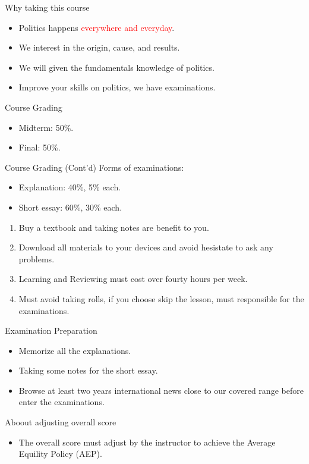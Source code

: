 \documentclass{beamer}
\begin{document}
\begin{frame}{Why taking this course}
\begin{itemize}
\item Politics happens \textcolor{red}{everywhere and everyday}.
\item We interest in the origin, cause, and results.
\item We will given the fundamentals knowledge of politics.
\item Improve your skills on politics, we have examinations.
\end{itemize}
\end{frame}
\begin{frame}{Course Grading}
\begin{itemize}
\item Midterm: 50\%.
\item Final: 50\%.
\end{itemize}
\end{frame}
\begin{frame}{Course Grading (Cont'd)}
Forms of examinations:
\begin{itemize}
\item Explanation: 40\%, 5\% each.
\item Short essay: 60\%, 30\% each.
\end{itemize}
\begin{enumerate}
\item Buy a textbook and taking notes are benefit to you.
\item Download all materials to your devices and avoid hesistate to ask any problems.
\item Learning and Reviewing must cost over fourty hours per week.
\item Must avoid taking rolls, if you choose skip the lesson, must responsible for the examinations.
\end{enumerate}
\end{frame}
\begin{frame}{Examination Preparation}
\begin{itemize}
\item Memorize all the explanations.
\item Taking some notes for the short essay.
\item Browse at least two years international news close to our covered range before enter the examinations.
\end{itemize}
\begin{block}{Aboout adjusting overall score}
\begin{itemize}
\item The overall score must adjust by the instructor to achieve the Average Equility Policy (AEP).
\end{itemize}
\end{block}
\end{frame}
\end{document}
